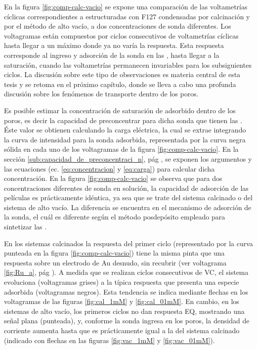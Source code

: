 	  En la figura \ref{fig:comp-calc-vacio} se expone una comparación de las voltametrías cíclicas correspondientes a \pdm\space estructuradas con F127 condensadas por calcinación y por el método de alto vacío, a dos concentraciones de sonda diferentes. Los voltagramas están compuestos por ciclos consecutivos de voltametrías cíclicas hasta llegar a un máximo donde ya no varía la respuesta. Esta respuesta corresponde al ingreso y adsorción de la sonda en las \pdm, hasta llegar a la saturación, cuando las voltametrías permanecen invariables para los subsiguientes ciclos. La discusión sobre este tipo de observaciones  es materia central de esta tesis y se retoma en el próximo capítulo, donde se lleva a cabo una profunda discusión sobre los fenómenos de transporte dentro de los poros.

      Es posible estimar la concentración de saturación de \ru\space adsorbido dentro de los poros, es decir la capacidad de preconcentrar para dicha sonda que tienen las \pdm. Éste valor se obtienen calculando la carga eléctrica, la cual se extrae integrando la curva de intensidad para la sonda adsorbida, representada por la curva negra sólida en cada uno de los voltagramas de la figura \ref{fig:comp-calc-vacio}. En la sección \ref{sub:capacidad_de_preconcentraci_n}, pág \pageref{sub:capacidad_de_preconcentraci_n}, se exponen los argumentos y las ecuaciones (ec. \ref{eq:concentracion} y \ref{eq:carga}) para calcular dicha concentración. En la figura \ref{fig:comp-calc-vacio} se observa que para dos concentraciones diferentes de sonda en solución, la capacidad de adsorción de las películas es prácticamente idéntica, ya sea que se trate del sistema calcinado o del sistema de alto vacío. La diferencia se encuentra en el mecanismo de adsorción de la sonda, el cuál es diferente según el método posdepósito empleado para sintetizar las \pdm.

      En los sistemas calcinados la respuesta del primer ciclo (representado por la curva punteada en la figura \ref{fig:comp-calc-vacio}) tiene la misma pinta que una respuesta sobre un electrodo de Au desnudo, sin recubrir (ver voltagrama \ref{fig:Ru_a}, pág \pageref{fig:Ru_a}). A medida que se realizan ciclos consecutivos de VC, el sistema evoluciona (voltagramas grises) a la típica respuesta que presenta una especie adsorbida (voltagramas negros). Esta tendencia se indica mediante flechas en los voltagramas de las figuras \ref{fig:cal_1mM} y \ref{fig:cal_01mM}. En cambio, en los sistemas de alto vacío, los primeros ciclos no dan respuesta EQ, mostrando una señal plana (punteada), y, conforme la sonda ingresa en los poros, la densidad de corriente aumenta hasta que es prácticamente igual a la del sistema calcinado (indicado con flechas en las figuras \ref{fig:vac_1mM} y \ref{fig:vac_01mM}). 

